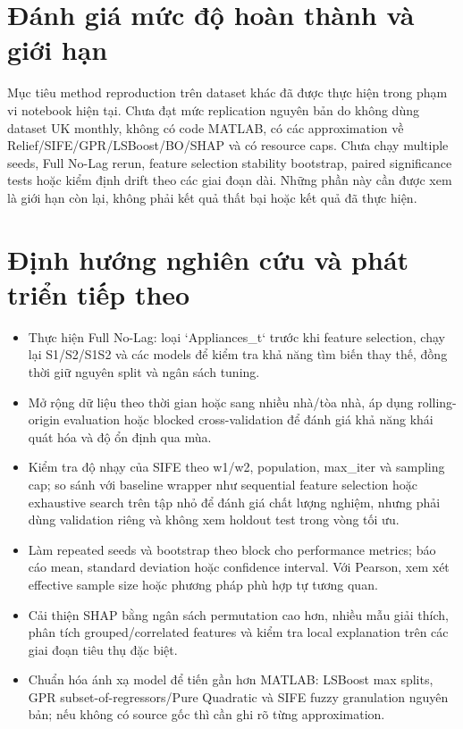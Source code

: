 \section{Đánh giá mức độ hoàn thành và giới hạn}\label{ux111uxe1nh-giuxe1-mux1ee9c-ux111ux1ed9-houxe0n-thuxe0nh-vuxe0-giux1edbi-hux1ea1n}

Mục tiêu method reproduction trên dataset khác đã được thực hiện trong phạm vi notebook hiện tại. Chưa đạt mức replication nguyên bản do không dùng dataset UK monthly, không có code MATLAB, có các approximation về Relief/\allowbreak SIFE/\allowbreak GPR/\allowbreak LSBoost/\allowbreak BO/\allowbreak SHAP và có resource caps. Chưa chạy multiple seeds, Full No-Lag rerun, feature selection stability bootstrap, paired significance tests hoặc kiểm định drift theo các giai đoạn dài. Những phần này cần được xem là giới hạn còn lại, không phải kết quả thất bại hoặc kết quả đã thực hiện.

\section{Định hướng nghiên cứu và phát triển tiếp theo}\label{ux111ux1ecbnh-hux1b0ux1edbng-nghiuxean-cux1ee9u-vuxe0-phuxe1t-triux1ec3n-tiux1ebfp-theo}

\begin{itemize}
\item
  Thực hiện Full No-Lag: loại `Appliances\_t` trước khi feature selection, chạy lại S1/S2/S1S2 và các models để kiểm tra khả năng tìm biến thay thế, đồng thời giữ nguyên split và ngân sách tuning.
\item
  Mở rộng dữ liệu theo thời gian hoặc sang nhiều nhà/tòa nhà, áp dụng rolling-origin evaluation hoặc blocked cross-validation để đánh giá khả năng khái quát hóa và độ ổn định qua mùa.
\item
  Kiểm tra độ nhạy của SIFE theo w1/w2, population, max\_iter và sampling cap; so sánh với baseline wrapper như sequential feature selection hoặc exhaustive search trên tập nhỏ để đánh giá chất lượng nghiệm, nhưng phải dùng validation riêng và không xem holdout test trong vòng tối ưu.
\item
  Làm repeated seeds và bootstrap theo block cho performance metrics; báo cáo mean, standard deviation hoặc confidence interval. Với Pearson, xem xét effective sample size hoặc phương pháp phù hợp tự tương quan.
\item
  Cải thiện SHAP bằng ngân sách permutation cao hơn, nhiều mẫu giải thích, phân tích grouped/correlated features và kiểm tra local explanation trên các giai đoạn tiêu thụ đặc biệt.
\item
  Chuẩn hóa ánh xạ model để tiến gần hơn MATLAB: LSBoost max splits, GPR subset-of-regressors/Pure Quadratic và SIFE fuzzy granulation nguyên bản; nếu không có source gốc thì cần ghi rõ từng approximation.
\end{itemize}

